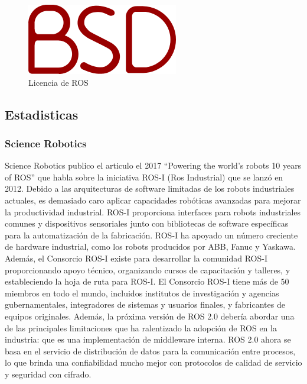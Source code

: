             \begin{figure}[htb]
                \centering
                \includegraphics[width=0.3\linewidth]{Main/Chapter3/Images3/3-5/licnecia-bsd-ros.png}
                \caption{Licencia de ROS}
                \label{f:Cap3-5_multilenguaje_ros}
            \end{figure}
            

\newpage

    \subsection{Estadisticas}
    
    \subsubsection{Science Robotics}
        Science Robotics publico el articulo el 2017 “Powering the world’s robots 10 years of ROS” \cite{Zhangeaar1868} que habla sobre la iniciativa ROS-I (Ros Industrial) que se lanzó en 2012. Debido a las arquitecturas de software limitadas de los robots industriales actuales, es demasiado caro aplicar capacidades robóticas avanzadas para mejorar la productividad industrial. ROS-I proporciona interfaces para robots industriales comunes y dispositivos sensoriales junto con bibliotecas de software específicas para la automatización de la fabricación. ROS-I ha apoyado un número creciente de hardware industrial, como los robots producidos por ABB, Fanuc y Yaskawa. Además, el Consorcio ROS-I existe para desarrollar la comunidad ROS-I proporcionando apoyo técnico, organizando cursos de capacitación y talleres, y estableciendo la hoja de ruta para ROS-I. El Consorcio ROS-I tiene más de 50 miembros en todo el mundo, incluidos institutos de investigación y agencias gubernamentales, integradores de sistemas y usuarios finales, y fabricantes de equipos originales. Además, la próxima versión de ROS 2.0 debería abordar una de las principales limitaciones que ha ralentizado la adopción de ROS en la industria: que es una implementación de middleware interna. ROS 2.0 ahora se basa en el servicio de distribución de datos para la comunicación entre procesos, lo que brinda una confiabilidad mucho mejor con protocolos de calidad de servicio y seguridad con cifrado.

